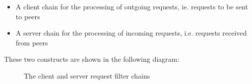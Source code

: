 \begin{itemize}
 \item A client chain for the processing of outgoing requests, ie. requests to be sent to peers
 \item A server chain for the processing of incoming requests, i.e. requests received from peers
\end{itemize}

These two constructs are shown in the following diagram:

\begin{figure}[H]
 \centering
 \caption{The client and server request filter chains}
 \label{fig:network.protocol.requestfilterchain}
\end{figure}

